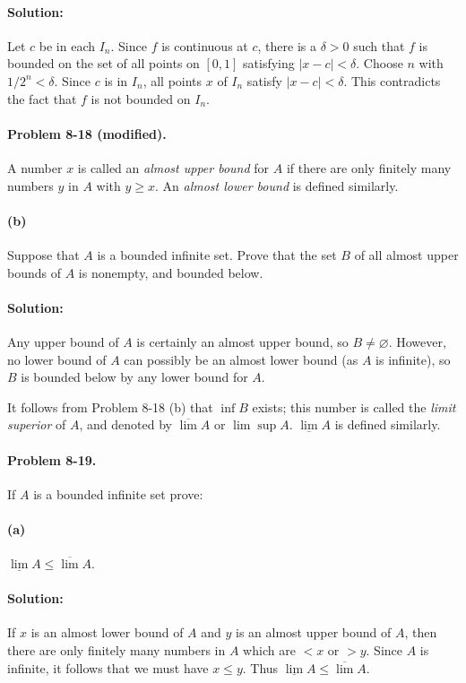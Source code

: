 \documentclass{article}
\begin{document}
\paragraph{Solution:} Let $c$ be in each $I_n$. Since $f$ is continuous at $c$,
there is a $\delta > 0$ such that $f$ is bounded on the set of all points on
$[0, 1]$ satisfying $|x - c| < \delta$. Choose $n$ with $1/2^n < \delta$. Since
$c$ is in $I_n$, all points $x$ of $I_n$ satisfy $|x - c| < \delta$. This
contradicts the fact that $f$ is not bounded on $I_n$.

\paragraph{Problem 8-18 (modified).} A number $x$ is called an \emph{almost
upper bound} for $A$ if there are only finitely many numbers $y$ in $A$ with $y
\geq x$. An \emph{almost lower bound} is defined similarly.

\paragraph{(b)} Suppose that $A$ is a bounded infinite set. Prove that the set
$B$ of all almost upper bounds of $A$ is nonempty, and bounded below.

\paragraph{Solution:} Any upper bound of $A$ is certainly an almost upper
bound, so $B \neq \varnothing$. However, no lower bound of $A$ can possibly be
an almost lower bound (as $A$ is infinite), so $B$ is bounded below by any
lower bound for $A$.

It follows from Problem 8-18 (b) that $\inf B$ exists; this number is
called the \emph{limit superior} of $A$, and denoted by $\overline{\lim} A$ or
$\lim \sup A$. $\underline{\lim} A$ is defined similarly.

\paragraph{Problem 8-19.} If $A$ is a bounded infinite set prove:

\paragraph{(a)} $\underline{\lim} A \leq \overline{\lim} A$.

\paragraph{Solution:} If $x$ is an almost lower bound of $A$ and $y$ is an
almost upper bound of $A$, then there are only finitely many numbers in $A$
which are $< x$ or $> y$. Since $A$ is infinite, it follows that we must have
$x \leq y$. Thus $\underline{\lim} A \leq \overline{\lim} A$.
\end{document}
